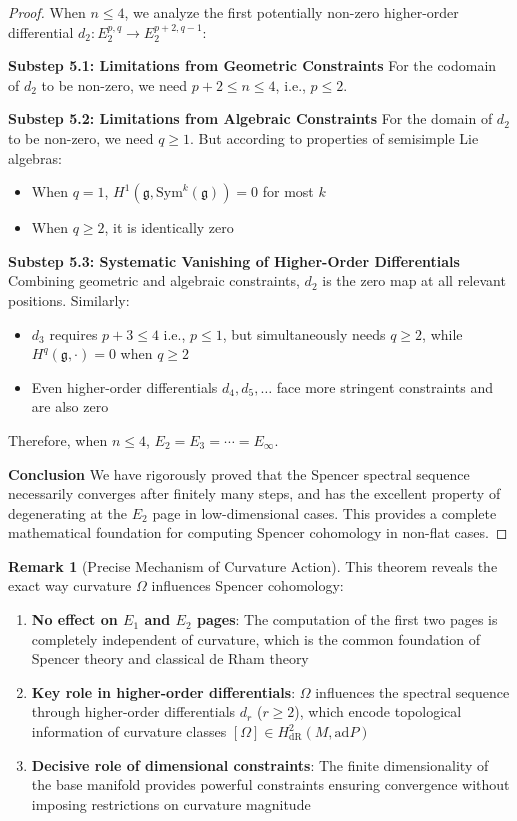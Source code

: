 \documentclass[a4paper,12pt]{extarticle}
\theoremstyle{definition}
\newtheorem{remark}{Remark}
\begin{document}
\begin{proof}
When $n \leq 4$, we analyze the first potentially non-zero higher-order differential $d_2: E_2^{p,q} \to E_2^{p+2, q-1}$:

\textbf{Substep 5.1: Limitations from Geometric Constraints}
For the codomain of $d_2$ to be non-zero, we need $p+2 \leq n \leq 4$, i.e., $p \leq 2$.

\textbf{Substep 5.2: Limitations from Algebraic Constraints}  
For the domain of $d_2$ to be non-zero, we need $q \geq 1$. But according to properties of semisimple Lie algebras:
\begin{itemize}
\item When $q = 1$, $H^1(\mathfrak{g}, \text{Sym}^k(\mathfrak{g})) = 0$ for most $k$
\item When $q \geq 2$, it is identically zero
\end{itemize}

\textbf{Substep 5.3: Systematic Vanishing of Higher-Order Differentials}
Combining geometric and algebraic constraints, $d_2$ is the zero map at all relevant positions. Similarly:
\begin{itemize}
\item $d_3$ requires $p+3 \leq 4$ i.e., $p \leq 1$, but simultaneously needs $q \geq 2$, while $H^q(\mathfrak{g}, \cdot) = 0$ when $q \geq 2$
\item Even higher-order differentials $d_4, d_5, \ldots$ face more stringent constraints and are also zero
\end{itemize}

Therefore, when $n \leq 4$, $E_2 = E_3 = \cdots = E_\infty$.

\textbf{Conclusion}
We have rigorously proved that the Spencer spectral sequence necessarily converges after finitely many steps, and has the excellent property of degenerating at the $E_2$ page in low-dimensional cases. This provides a complete mathematical foundation for computing Spencer cohomology in non-flat cases.
\end{proof}

\begin{remark}[Precise Mechanism of Curvature Action]
This theorem reveals the exact way curvature $\Omega$ influences Spencer cohomology:
\begin{enumerate}
\item \textbf{No effect on $E_1$ and $E_2$ pages}: The computation of the first two pages is completely independent of curvature, which is the common foundation of Spencer theory and classical de Rham theory
\item \textbf{Key role in higher-order differentials}: $\Omega$ influences the spectral sequence through higher-order differentials $d_r$ ($r \geq 2$), which encode topological information of curvature classes $[\Omega] \in H^2_{\text{dR}}(M, \text{ad} P)$
\item \textbf{Decisive role of dimensional constraints}: The finite dimensionality of the base manifold provides powerful constraints ensuring convergence without imposing restrictions on curvature magnitude
\end{enumerate}
\end{remark}
\end{document}
